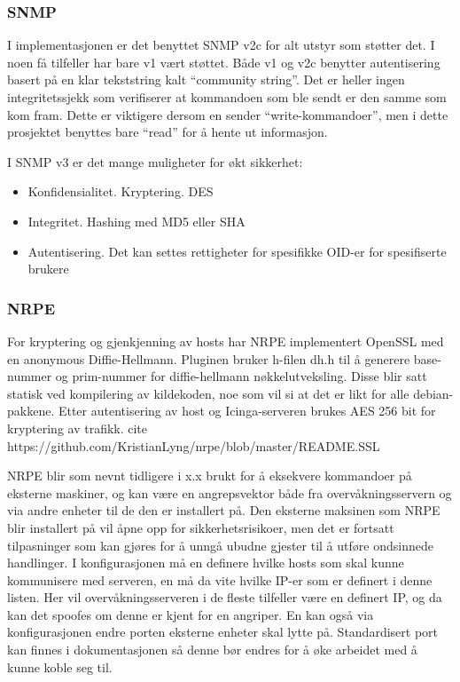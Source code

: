 \subsubsection{SNMP}
I implementasjonen er det benyttet SNMP v2c for alt utstyr som støtter det. I noen få tilfeller har bare v1 vært støttet. Både v1 og v2c benytter autentisering basert på en klar tekststring kalt “community string”. Det er heller ingen integritetssjekk som verifiserer at kommandoen som ble sendt er den samme som kom fram. Dette er viktigere dersom en sender “write-kommandoer”, men i dette prosjektet benyttes bare “read” for å hente ut informasjon.

I SNMP v3 er det mange muligheter for økt sikkerhet:
\begin{itemize}
	\item Konfidensialitet. Kryptering. DES
	\item Integritet. Hashing med MD5 eller SHA
	\item Autentisering. Det kan settes rettigheter for spesifikke OID-er for spesifiserte brukere
\end{itemize}

\subsubsection{NRPE}
For kryptering og gjenkjenning av hosts har NRPE implementert OpenSSL med en anonymous Diffie-Hellmann. Pluginen bruker h-filen dh.h til å generere base-nummer og prim-nummer for diffie-hellmann nøkkelutveksling. Disse blir satt statisk ved kompilering av kildekoden, noe som vil si at det er likt for alle debian-pakkene. Etter autentisering av host og Icinga-serveren brukes AES 256 bit for kryptering av trafikk. cite https://github.com/KristianLyng/nrpe/blob/master/README.SSL

NRPE blir som nevnt tidligere i x.x brukt for å eksekvere kommandoer på eksterne maskiner, og kan være en angrepsvektor både fra overvåkningsservern og via andre enheter til de den er installert på. Den eksterne maksinen som NRPE blir installert på vil åpne opp for sikkerhetsrisikoer, men det er fortsatt tilpasninger som kan gjøres for å unngå ubudne gjester til å utføre ondsinnede handlinger. I konfigurasjonen må en definere hvilke hosts som skal kunne kommunisere med serveren, en må da vite hvilke IP-er som er definert i denne listen. Her vil overvåkningsserveren  i de fleste tilfeller være en definert IP, og da kan det spoofes om denne er kjent for en angriper. En kan også via konfigurasjonen endre porten eksterne enheter skal lytte på. Standardisert port kan finnes i dokumentasjonen så denne bør endres for å øke arbeidet med å kunne koble seg til.

